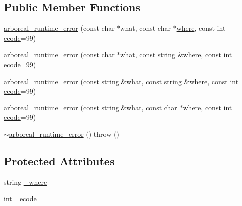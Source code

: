 \subsection*{Public Member Functions}
\begin{DoxyCompactItemize}
\item 
\mbox{\hyperlink{classarboreal__runtime__error_aa6970966b569a105ead4fc6a5648cb5e}{arboreal\+\_\+runtime\+\_\+error}} (const char $\ast$what, const char $\ast$\mbox{\hyperlink{classarboreal__exception_a802003dee586aaeb0b0d7ce909da2dad}{where}}, const int \mbox{\hyperlink{classarboreal__exception_a318e716601c544d92ff9af25edebd725}{ecode}}=99)
\item 
\mbox{\hyperlink{classarboreal__runtime__error_af20cdd8f990b40293bbbf11f3fe1005b}{arboreal\+\_\+runtime\+\_\+error}} (const char $\ast$what, const string \&\mbox{\hyperlink{classarboreal__exception_a802003dee586aaeb0b0d7ce909da2dad}{where}}, const int \mbox{\hyperlink{classarboreal__exception_a318e716601c544d92ff9af25edebd725}{ecode}}=99)
\item 
\mbox{\hyperlink{classarboreal__runtime__error_a3797d6f9ba8c5590539b280042d023a5}{arboreal\+\_\+runtime\+\_\+error}} (const string \&what, const string \&\mbox{\hyperlink{classarboreal__exception_a802003dee586aaeb0b0d7ce909da2dad}{where}}, const int \mbox{\hyperlink{classarboreal__exception_a318e716601c544d92ff9af25edebd725}{ecode}}=99)
\item 
\mbox{\hyperlink{classarboreal__runtime__error_a897b94adcbe8bdbcd8c7299d95c4e020}{arboreal\+\_\+runtime\+\_\+error}} (const string \&what, const char $\ast$\mbox{\hyperlink{classarboreal__exception_a802003dee586aaeb0b0d7ce909da2dad}{where}}, const int \mbox{\hyperlink{classarboreal__exception_a318e716601c544d92ff9af25edebd725}{ecode}}=99)
\item 
\mbox{\hyperlink{classarboreal__runtime__error_a2ca3feee404c72fae9af44cc812a50ce}{$\sim$arboreal\+\_\+runtime\+\_\+error}} ()  throw ()
\end{DoxyCompactItemize}
\subsection*{Protected Attributes}
\begin{DoxyCompactItemize}
\item 
string \mbox{\hyperlink{classarboreal__runtime__error_afca0adf6a259600843b6975591e0bde4}{\+\_\+where}}
\item 
int \mbox{\hyperlink{classarboreal__runtime__error_a08953e7ed35ac7db0d86032a3eb3f837}{\+\_\+ecode}}
\end{DoxyCompactItemize}


